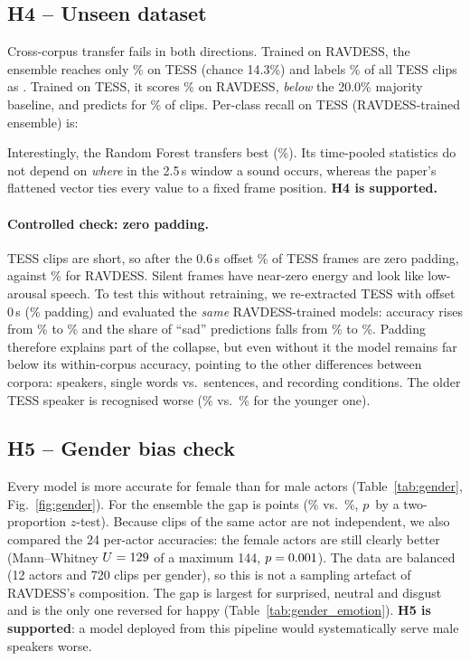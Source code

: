 \subsection{H4 -- Unseen dataset}
Cross-corpus transfer fails in both directions. Trained on RAVDESS, the ensemble reaches only \AccRTEns\% on TESS
(chance 14.3\%) and labels \TessTopPredShare\% of all TESS clips as \emph{\TessTopPred}. Trained on TESS, it scores
\AccTREns\% on RAVDESS, \emph{below} the 20.0\% majority baseline, and predicts \emph{\RavTopPred} for
\RavTopPredShare\% of clips. Per-class recall on TESS (RAVDESS-trained ensemble) is:

\smallskip
\centerline{\small}
\smallskip

\noindent Interestingly, the Random Forest transfers best (\AccRTRf\%). Its time-pooled statistics do not depend
on \emph{where} in the 2.5\,s window a sound occurs, whereas the paper's flattened vector ties every value to a
fixed frame position. \textbf{H4 is supported.}

\paragraph{Controlled check: zero padding.} TESS clips are short, so after the 0.6\,s offset \OffsetPadPaper\% of
TESS frames are zero padding, against \RavPadPct\% for RAVDESS. Silent frames have near-zero energy and look like
low-arousal speech. To test this without retraining, we re-extracted TESS with offset 0\,s
(\OffsetPadZero\% padding) and evaluated the \emph{same} RAVDESS-trained models: accuracy rises from
\OffsetAccPaper\% to \OffsetAccZero\% and the share of ``sad'' predictions falls from \OffsetSadPaper\% to
\OffsetSadZero\%. Padding therefore explains part of the collapse, but even without it the model remains far below
its within-corpus accuracy, pointing to the other differences between corpora: speakers, single words vs.\
sentences, and recording conditions. The older TESS speaker is recognised worse (\TessAccOaf\% vs.\
\TessAccYaf\% for the younger one).

\subsection{H5 -- Gender bias check}
Every model is more accurate for female than for male actors (Table~\ref{tab:gender}, Fig.~\ref{fig:gender}). For
the ensemble the gap is \GenderGapEns{} points (\GenderFemaleEns\% vs.\ \GenderMaleEns\%, $p$\,\GenderPEns{} by a
two-proportion $z$-test). Because clips of the same actor are not independent, we also compared the 24 per-actor
accuracies: the female actors are still clearly better (Mann--Whitney $U=129$ of a maximum 144,
$p=0.001$). The data are balanced (12 actors and 720 clips per gender), so this is not a sampling artefact
of RAVDESS's composition. The gap is largest for surprised, neutral and disgust and is the only one reversed for
happy (Table~\ref{tab:gender_emotion}). \textbf{H5 is supported}: a model deployed from this pipeline would
systematically serve male speakers worse.


